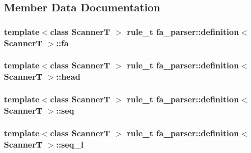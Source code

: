 \subsection{Member Data Documentation}
\hypertarget{structfa__parser_1_1definition_a48eca12d36bc711248eebb4f850a83c8}{
\subsubsection[{fa}]{\setlength{\rightskip}{0pt plus 5cm}template$<$class Scanner\+T $>$ {\bf rule\+\_\+t} {\bf fa\+\_\+parser\+::definition}$<$ Scanner\+T $>$\+::fa}}\label{structfa__parser_1_1definition_a48eca12d36bc711248eebb4f850a83c8}
\hypertarget{structfa__parser_1_1definition_a9ac398c08482622c6231ca45ae3637c7}{
\subsubsection[{head}]{\setlength{\rightskip}{0pt plus 5cm}template$<$class Scanner\+T $>$ {\bf rule\+\_\+t} {\bf fa\+\_\+parser\+::definition}$<$ Scanner\+T $>$\+::head}}\label{structfa__parser_1_1definition_a9ac398c08482622c6231ca45ae3637c7}
\hypertarget{structfa__parser_1_1definition_af773d1e41b99324de86ac074ef275379}{
\subsubsection[{seq}]{\setlength{\rightskip}{0pt plus 5cm}template$<$class Scanner\+T $>$ {\bf rule\+\_\+t} {\bf fa\+\_\+parser\+::definition}$<$ Scanner\+T $>$\+::seq}}\label{structfa__parser_1_1definition_af773d1e41b99324de86ac074ef275379}
\hypertarget{structfa__parser_1_1definition_acb61c19eed7df6831e569ba26e260f71}{
\subsubsection[{seq\+\_\+l}]{\setlength{\rightskip}{0pt plus 5cm}template$<$class Scanner\+T $>$ {\bf rule\+\_\+t} {\bf fa\+\_\+parser\+::definition}$<$ Scanner\+T $>$\+::seq\+\_\+l}}\label{structfa__parser_1_1definition_acb61c19eed7df6831e569ba26e260f71}
